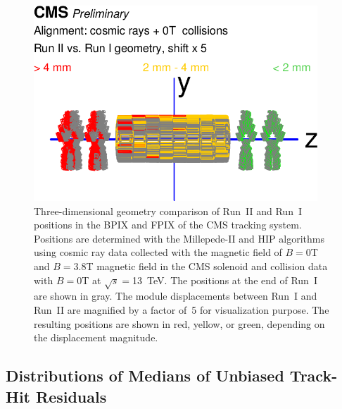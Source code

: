 \begin{figure}[htb]
    \begin{center}
        \includegraphics[width=0.95\textwidth]{../figs/Alignment/AlRes_RunIIvsRunI.png}
    \end{center}
    \caption{Three-dimensional geometry comparison of Run~II and Run~I positions in the BPIX and FPIX of the CMS tracking system. Positions are determined with the Millepede-II and HIP algorithms using cosmic ray data collected with the magnetic field of $B=$0T and $B=$3.8T magnetic field in the CMS solenoid and collision data with $B=$0T at $\sqrt{s}=$13~TeV. The positions at the end of Run~I are shown in gray. The module displacements between Run~I and Run~II are magnified by a factor of~5 for visualization purpose. The resulting positions are shown in red, yellow, or green, depending on the displacement magnitude. }
    \label{fig:GCP_3D}
\end{figure}

\clearpage

\subsection{Distributions of Medians of Unbiased Track-Hit Residuals}
\label{sec:AlRes_DMRs}

